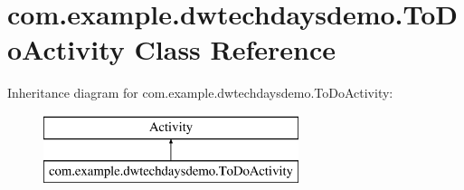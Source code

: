 \hypertarget{a00186}{}\section{com.\+example.\+dwtechdaysdemo.\+To\+Do\+Activity Class Reference}
\label{a00186}
Inheritance diagram for com.\+example.\+dwtechdaysdemo.\+To\+Do\+Activity\+:\begin{figure}[H]
\begin{center}
\leavevmode
\includegraphics[height=2.000000cm]{a00186}
\end{center}
\end{figure}
